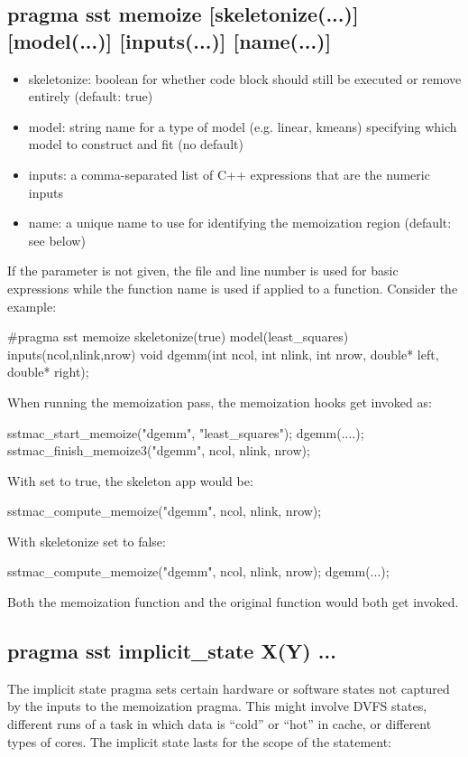 \subsection{pragma sst memoize [skeletonize(...)] [model(...)] [inputs(...)] [name(...)]}
\begin{itemize}
\item skeletonize: boolean for whether code block should still be executed or remove entirely (default: true)
\item model: string name for a type of model (e.g. linear, kmeans) specifying which model to construct and fit (no default)
\item inputs: a comma-separated list of C++ expressions that are the numeric inputs
\item name: a unique name to use for identifying the memoization region (default: see below)
\end{itemize}
If the  parameter is not given, the file and line number is used for basic expressions while the function name is used if applied to a function.
Consider the example:

\begin{CppCode}
#pragma sst memoize skeletonize(true) model(least_squares) inputs(ncol,nlink,nrow) 
void dgemm(int ncol, int nlink, int nrow, double* left, double* right);
\end{CppCode}
When running the memoization pass, the memoization hooks get invoked as:

\begin{CppCode}
sstmac_start_memoize("dgemm", "least_squares");
dgemm(....);
sstmac_finish_memoize3("dgemm", ncol, nlink, nrow);
\end{CppCode}
With  set to true, the skeleton app would be:

\begin{CppCode}
sstmac_compute_memoize("dgemm", ncol, nlink, nrow);
\end{CppCode}
With skeletonize set to false:

\begin{CppCode}
sstmac_compute_memoize("dgemm", ncol, nlink, nrow);
dgemm(...);
\end{CppCode}
Both the memoization function and the original function would both get invoked.

\subsection{pragma sst implicit\_state X(Y) ...}\label{subsec:implicitStates}
The implicit state pragma sets certain hardware or software states not captured by the inputs to the memoization pragma.
This might involve DVFS states, different runs of a task in which data is ``cold'' or ``hot'' in cache, or different types of cores.
The implicit state lasts for the scope of the statement:

